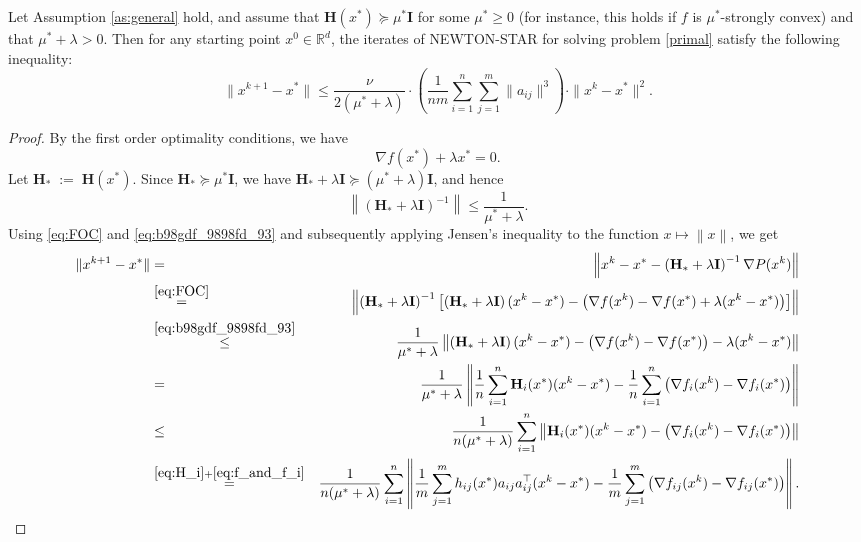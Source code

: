 \documentclass[12pt]{article}
\newcommand{\squeeze}{}
\newcommand{\eqdef}{\; { := }\;}
\newcommand{\R}{\mathbb{R}}
\newcommand{\norm}[1]{\left\|#1\right\|}
\newcommand{\newalpha}{h}
\newcommand{\mH}{\mathbf{H}}
\newcommand{\mI}{\mathbf{I}}
\begin{document}
\begin{theorem}\label{th:localquadratic}
Let  Assumption \ref{as:general} hold,  and assume that $\mH(x^*) \succeq \mu^* \mI$ for some $\mu^* \geq 0$ (for instance, this holds if $f$ is $\mu^*$-strongly convex) and that $\mu^*+\lambda >0$. Then for any starting point $x^0 \in \R^d$, the iterates of {\sf NEWTON-STAR} for solving problem \eqref{primal}   satisfy the following inequality:
\begin{equation}
\label{eq:NS-rate}
 \squeeze
 \|x^{k+1} - x^*\| \leq \frac{\nu }{2(\mu^*+\lambda)} \cdot \left( \frac{1}{nm} \sum \limits_{i=1}^n \sum \limits_{j=1}^{m} \|a_{ij}\|^3 \right) \cdot \|x^k-x^*\|^2. 
\end{equation}
\end{theorem}
\begin{proof}
{\footnotesize
By the first order optimality conditions, we have 
\begin{equation}\nabla f(x^*) + \lambda x^* = 0.\label{eq:FOC}\end{equation}
Let $\mH_* \eqdef \mH(x^*)$. Since $\mH_* \succeq \mu^* \mI$, we have $\mH_* +\lambda \mI \succeq (\mu^* +\lambda) \mI$, and hence \begin{equation}\label{eq:b98gdf_9898fd_93} \norm{\left(\mH_* + \lambda \mI\right)^{-1} } \leq \frac{1}{\mu^*+\lambda}.\end{equation} 
Using \eqref{eq:FOC} and \eqref{eq:b98gdf_9898fd_93}  and subsequently applying Jensen's inequality  to the function $x\mapsto \norm{x}$, we get 
\begin{eqnarray}
	\|x^{k+1} - x^*\| &=& \left \| x^k - x^*  - \left(\mH_* +\lambda \mI \right)^{-1} \nabla P(x^k)  \right \|  \notag \\
	&\overset{\eqref{eq:FOC}}{=}& \left \| \left(\mH_* +\lambda \mI \right)^{-1} \left[ \left(\mH_* + \lambda \mI \right)(x^k - x^*) - \left(\nabla f(x^k) -\nabla f(x^*)+ \lambda (x^k-x^*)\right)   \right] \right \|  \notag \\ 
	&\overset{\eqref{eq:b98gdf_9898fd_93}}{\leq} &\frac{1}{\mu^*+\lambda} \left \|  \left(\mH_* + \lambda \mI \right) (x^k - x^*) - \left( \nabla f(x^k) - \nabla f(x^*)   \right) - \lambda (x^k -x^*) \right \|  \notag \\ 
	&= &\frac{1}{\mu^*+\lambda} \left \|  \frac{1}{n} \sum_{i=1}^{n}  \mH_i(x^*) (x^k - x^*) -  \frac{1}{n}\sum_{i=1}^n \left( \nabla f_i(x^k) - \nabla f_i(x^*)   \right) \right \|  \notag \\ 
	&\leq & \frac{1}{n (\mu^*+\lambda)} \sum_{i=1}^{n}  \left \|  \mH_i(x^*) (x^k - x^*) -  \left( \nabla f_i(x^k) - \nabla f_i(x^*)   \right) \right \|  \notag \\ 	
	&\overset{\eqref{eq:H_i}+\eqref{eq:f_and_f_i} }{=} &\frac{1}{n (\mu^*+\lambda)} \sum_{i=1}^{n}  \left \| \frac{1}{m} \sum_{j=1}^m \newalpha_{ij}(x^*) a_{ij} a_{ij}^\top (x^k - x^*) -  \frac{1}{m} \sum_{j=1}^m \left( \nabla f_{ij}(x^k) - \nabla f_{ij}(x^*)   \right) \right \|  . \label{eq:rand-opur-9}
	\end{eqnarray}
	
}
\end{proof}
\end{document}
